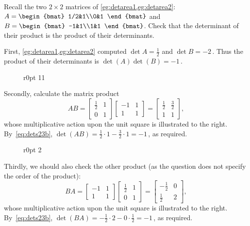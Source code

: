 \begin{example} 
Recall the two \(2\times2\) matrices of \cref{eg:detarea1,eg:detarea2}:
\(A=\begin{bmat} 1/2&1\\0&1 \end{bmat}\) and
\(B=\begin{bmat} -1&1\\1&1 \end{bmat}\).
Check that the determinant of their product is the product of their determinants. 
\begin{solution} 
First, \cref{eg:detarea1,eg:detarea2} computed \(\det A=\tfrac12\) and \(\det B=-2\)\,.
Thus the product of their determinants is \(\det(A)\det(B)=-1\)\,.

\begin{wrapfigure}r{0pt} 11 \end{wrapfigure}
Secondly, calculate the matrix product
\begin{equation*}
AB=\begin{bmatrix} \tfrac12&1\\0&1 \end{bmatrix}
\begin{bmatrix} -1&1\\1&1 \end{bmatrix}
=\begin{bmatrix} \tfrac12&\tfrac32\\1&1 \end{bmatrix},
\end{equation*}
whose multiplicative action upon the unit square is illustrated to the right.
By~\eqref{eq:dets23b}, \(\det(AB)=\frac12\cdot1-\frac32\cdot1=-1\)\,, as required.
 
\begin{wrapfigure}r{0pt} 2 \end{wrapfigure}
Thirdly, we should also check the other product (as the question does not specify the order of the product):
\begin{equation*}
BA=\begin{bmatrix} -1&1\\1&1 \end{bmatrix}
\begin{bmatrix} \tfrac12&1\\0&1 \end{bmatrix}
=\begin{bmatrix} -\tfrac12&0\\\tfrac12&2 \end{bmatrix},
\end{equation*}
whose multiplicative action upon the unit square is illustrated to the right.
By~\eqref{eq:dets23b}, \(\det(BA)=-\frac12\cdot2-0\cdot\frac12=-1\)\,, as required.
\aqed

\end{solution}
\end{example}




